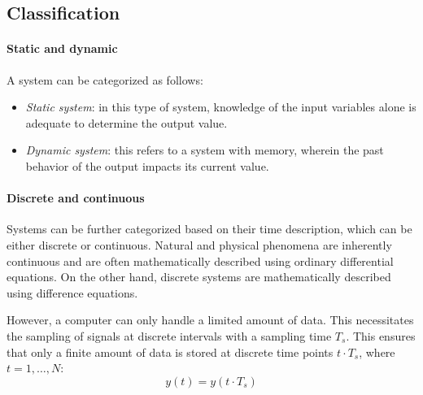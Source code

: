 \subsection{Classification}

\paragraph*{Static and dynamic}
A system can be categorized as follows:
\begin{itemize}
    \item \textit{Static system}: in this type of system, knowledge of the input variables alone is adequate to determine the output value.
    \item \textit{Dynamic system}: this refers to a system with memory, wherein the past behavior of the output impacts its current value.
\end{itemize}

\paragraph*{Discrete and continuous}
Systems can be further categorized based on their time description, which can be either discrete or continuous.
Natural and physical phenomena are inherently continuous and are often mathematically described using ordinary differential equations.
On the other hand, discrete systems are mathematically described using difference equations.

However, a computer can only handle a limited amount of data. 
This necessitates the sampling of signals at discrete intervals with a sampling time $T_s$. 
This ensures that only a finite amount of data is stored at discrete time points $t \cdot T_s$, where $t=1,\dots,N$: 
\[y(t)=y(t \cdot T_s)\]